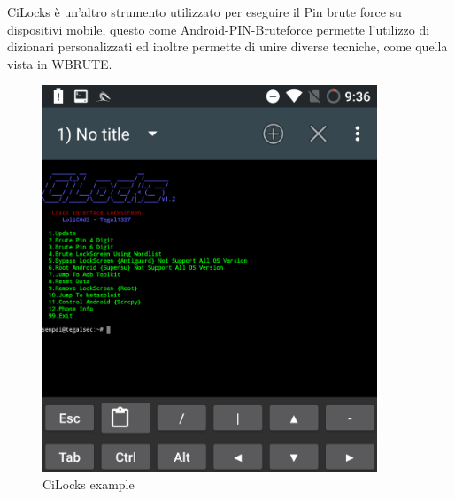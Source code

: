 CiLocks\cite{CiLocks} è un'altro strumento utilizzato per eseguire il Pin brute force su dispositivi mobile, questo come Android-PIN-Bruteforce permette l'utilizzo di dizionari personalizzati ed inoltre permette di unire diverse tecniche, come quella vista in WBRUTE.

\begin{figure}[h!]
	\centering
	\includegraphics[width=100mm]{Immagini/3/cilocks.png}
	\caption{CiLocks example}
    \label{fig:CiLocks_example}
\end{figure}